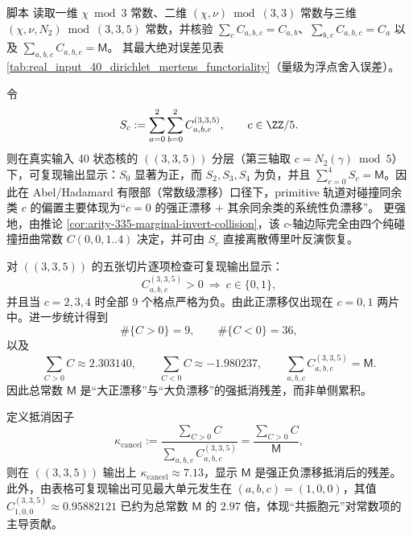 \begin{remark}\label{rem:dirichlet-mertens-functoriality-check}
脚本  读取一维 \(\chi\bmod 3\) 常数、二维 \((\chi,\nu)\bmod(3,3)\) 常数与三维 \((\chi,\nu,N_2)\bmod(3,3,5)\) 常数，并核验
\(\sum_c C_{a,b,c}=C_{a,b}\)、\(\sum_{b,c}C_{a,b,c}=C_a\) 以及 \(\sum_{a,b,c}C_{a,b,c}=\mathsf{M}\)。
其最大绝对误差见表 \ref{tab:real_input_40_dirichlet_mertens_functoriality}（量级为浮点舍入误差）。
\end{remark}



\begin{remark}\label{cor:arity-335-collision-residue-drift}
令
\[
S_c:=\sum_{a=0}^{2}\sum_{b=0}^{2}C^{(3,3,5)}_{a,b,c},
\qquad c\in\ZZ/5.
\]
则在真实输入 40 状态核的 \(((3,3,5))\) 分层（第三轴取 $c=N_2(\gamma)\bmod 5$）下，可复现输出显示：$S_0$ 显著为正，而 $S_2,S_3,S_4$ 为负，并且 $\sum_{c=0}^4 S_c=\mathsf{M}$。因此在 Abel/Hadamard 有限部（常数级漂移）口径下，primitive 轨道对碰撞同余类 $c$ 的偏置主要体现为“$c=0$ 的强正漂移 + 其余同余类的系统性负漂移”。
更强地，由推论 \ref{cor:arity-335-marginal-invert-collision}，该 \(c\)-轴边际完全由四个纯碰撞扭曲常数 \(C(0,0,1..4)\) 决定，并可由 \(S_c\) 直接离散傅里叶反演恢复。
\end{remark}

\begin{remark}[符号相变阈值与正漂移稀疏性]\label{cor:arity-335-sign-sparsity}
对 \(((3,3,5))\) 的五张切片逐项检查可复现输出显示：
\[
C^{(3,3,5)}_{a,b,c}>0\ \Longrightarrow\ c\in\{0,1\},
\]
并且当 $c=2,3,4$ 时全部 $9$ 个格点严格为负。由此正漂移仅出现在 $c=0,1$ 两片中。进一步统计得到
\[
\#\{C>0\}=9,\qquad \#\{C<0\}=36,
\]
以及
\[
\sum_{C>0}C\approx 2.303140,\qquad
\sum_{C<0}C\approx -1.980237,\qquad
\sum_{a,b,c}C^{(3,3,5)}_{a,b,c}=\mathsf{M}.
\]
因此总常数 $\mathsf{M}$ 是“大正漂移”与“大负漂移”的强抵消残差，而非单侧累积。
\end{remark}

\begin{remark}[抵消因子与共振胞元]\label{rem:arity-335-cancel-resonant}
定义抵消因子
\[
\kappa_{\mathrm{cancel}}:=\frac{\sum_{C>0}C}{\sum_{a,b,c}C^{(3,3,5)}_{a,b,c}}
=\frac{\sum_{C>0}C}{\mathsf{M}},
\]
则在 \(((3,3,5))\) 输出上
\(
\kappa_{\mathrm{cancel}}\approx 7.13
\)，显示 $\mathsf{M}$ 是强正负漂移抵消后的残差。
此外，由表格可复现输出可见最大单元发生在
\(
(a,b,c)=(1,0,0)
\)，其值
\(
C^{(3,3,5)}_{1,0,0}\approx 0.95882121
\)
已约为总常数 $\mathsf{M}$ 的 $2.97$ 倍，体现“共振胞元”对常数项的主导贡献。
\end{remark}

